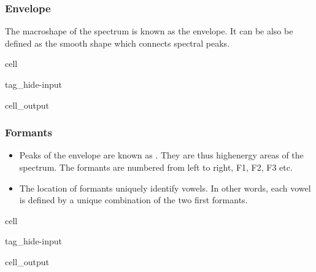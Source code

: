 \documentclass[letterpaper,10pt,english]{jupyterBook}
\begin{document}
\subsubsection{Envelope}
\label{\detokenize{Representations/Short-time_analysis:envelope}}
\sphinxAtStartPar
The macro\sphinxhyphen{}shape of the spectrum is known as the envelope. It can be also be defined as the smooth shape which connects spectral peaks.

\begin{sphinxuseclass}{cell}
\begin{sphinxuseclass}{tag_hide-input}\begin{sphinxVerbatimOutput}

\begin{sphinxuseclass}{cell_output}
\noindent{}

\end{sphinxuseclass}\end{sphinxVerbatimOutput}

\end{sphinxuseclass}
\end{sphinxuseclass}

\subsubsection{Formants}
\label{\detokenize{Representations/Short-time_analysis:formants}}\begin{itemize}
\item {} 
\sphinxAtStartPar
Peaks of the envelope are known as . They are thus high\sphinxhyphen{}energy areas of the spectrum. The formants are numbered from left to right, F1, F2, F3 etc.

\item {} 
\sphinxAtStartPar
The location of formants uniquely identify vowels. In other words, each vowel is defined by a unique combination of the two first formants.

\end{itemize}

\begin{sphinxuseclass}{cell}
\begin{sphinxuseclass}{tag_hide-input}\begin{sphinxVerbatimOutput}

\begin{sphinxuseclass}{cell_output}
\noindent{}

\end{sphinxuseclass}\end{sphinxVerbatimOutput}

\end{sphinxuseclass}
\end{sphinxuseclass}
\end{document}
